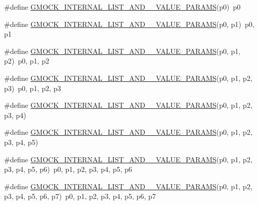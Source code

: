 \begin{DoxyCompactItemize}
\item 
\#define \mbox{\hyperlink{_obj__test_2lib_2googletest-master_2googlemock_2include_2gmock_2gmock-generated-actions_8h_a12895511e72c47c78850542b68fe83d4}{G\+M\+O\+C\+K\+\_\+\+I\+N\+T\+E\+R\+N\+A\+L\+\_\+\+L\+I\+S\+T\+\_\+\+A\+N\+D\+\_\+\_\+\+V\+A\+L\+U\+E\+\_\+\+P\+A\+R\+A\+MS}}(p0)~p0
\item 
\#define \mbox{\hyperlink{_obj__test_2lib_2googletest-master_2googlemock_2include_2gmock_2gmock-generated-actions_8h_ac0efec20319ea66c5508b6e5ad42c357}{G\+M\+O\+C\+K\+\_\+\+I\+N\+T\+E\+R\+N\+A\+L\+\_\+\+L\+I\+S\+T\+\_\+\+A\+N\+D\+\_\+\_\+\+V\+A\+L\+U\+E\+\_\+\+P\+A\+R\+A\+MS}}(p0,  p1)~p0, p1
\item 
\#define \mbox{\hyperlink{_obj__test_2lib_2googletest-master_2googlemock_2include_2gmock_2gmock-generated-actions_8h_a10f92233f148b19f341e1a17267107d3}{G\+M\+O\+C\+K\+\_\+\+I\+N\+T\+E\+R\+N\+A\+L\+\_\+\+L\+I\+S\+T\+\_\+\+A\+N\+D\+\_\+\_\+\+V\+A\+L\+U\+E\+\_\+\+P\+A\+R\+A\+MS}}(p0,  p1,  p2)~p0, p1, p2
\item 
\#define \mbox{\hyperlink{_obj__test_2lib_2googletest-master_2googlemock_2include_2gmock_2gmock-generated-actions_8h_a8df889711a5f99ed76736a2bc5030cf2}{G\+M\+O\+C\+K\+\_\+\+I\+N\+T\+E\+R\+N\+A\+L\+\_\+\+L\+I\+S\+T\+\_\+\+A\+N\+D\+\_\+\_\+\+V\+A\+L\+U\+E\+\_\+\+P\+A\+R\+A\+MS}}(p0,  p1,  p2,  p3)~p0, p1, p2, p3
\item 
\#define \mbox{\hyperlink{_obj__test_2lib_2googletest-master_2googlemock_2include_2gmock_2gmock-generated-actions_8h_a4bfd52ebc75b6da1a84e5a59e12995fe}{G\+M\+O\+C\+K\+\_\+\+I\+N\+T\+E\+R\+N\+A\+L\+\_\+\+L\+I\+S\+T\+\_\+\+A\+N\+D\+\_\+\_\+\+V\+A\+L\+U\+E\+\_\+\+P\+A\+R\+A\+MS}}(p0,  p1,  p2,  p3,  p4)
\item 
\#define \mbox{\hyperlink{_obj__test_2lib_2googletest-master_2googlemock_2include_2gmock_2gmock-generated-actions_8h_a553114b6d5e3f751a9f122fb71a3abdb}{G\+M\+O\+C\+K\+\_\+\+I\+N\+T\+E\+R\+N\+A\+L\+\_\+\+L\+I\+S\+T\+\_\+\+A\+N\+D\+\_\+\_\+\+V\+A\+L\+U\+E\+\_\+\+P\+A\+R\+A\+MS}}(p0,  p1,  p2,  p3,  p4,  p5)
\item 
\#define \mbox{\hyperlink{_obj__test_2lib_2googletest-master_2googlemock_2include_2gmock_2gmock-generated-actions_8h_a6a66c76963794fca308b7e2852188e06}{G\+M\+O\+C\+K\+\_\+\+I\+N\+T\+E\+R\+N\+A\+L\+\_\+\+L\+I\+S\+T\+\_\+\+A\+N\+D\+\_\+\_\+\+V\+A\+L\+U\+E\+\_\+\+P\+A\+R\+A\+MS}}(p0,  p1,  p2,  p3,  p4,  p5,  p6)~p0, p1, p2, p3, p4, p5, p6
\item 
\#define \mbox{\hyperlink{_obj__test_2lib_2googletest-master_2googlemock_2include_2gmock_2gmock-generated-actions_8h_af9a5e8a55b02e7afac317a2613bd29ec}{G\+M\+O\+C\+K\+\_\+\+I\+N\+T\+E\+R\+N\+A\+L\+\_\+\+L\+I\+S\+T\+\_\+\+A\+N\+D\+\_\+\_\+\+V\+A\+L\+U\+E\+\_\+\+P\+A\+R\+A\+MS}}(p0,  p1,  p2,  p3,  p4,  p5,  p6,  p7)~p0, p1, p2, p3, p4, p5, p6, p7

\end{DoxyCompactItemize}
